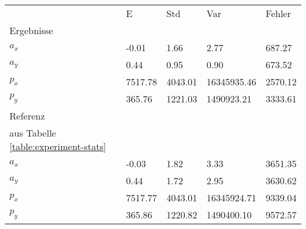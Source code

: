 \begin{tabular}{l|l|l|l|l}

     & E   & Std    & Var    & Fehler \\
\hhline{=|=|=|=|=}

Ergebnisse & & & & \\
$a_x$  &        -0.01 &         1.66 &         2.77 &       687.27 \\
$a_y$  &         0.44 &         0.95 &         0.90 &       673.52 \\
$p_x$  &      7517.78 &      4043.01 &  16345935.46 &      2570.12 \\
$p_y$  &       365.76 &      1221.03 &   1490923.21 &      3333.61 \\

\hline
Referenz & & & & \\
aus Tabelle  \ref{table:experiment-stats} & & & & \\
$a_x$  &        -0.03 &         1.82 &         3.33 &      3651.35 \\
$a_y$  &         0.44 &         1.72 &         2.95 &      3630.62 \\
$p_x$  &      7517.77 &      4043.01 &  16345924.71 &      9339.04 \\
$p_y$  &       365.86 &      1220.82 &   1490400.10 &      9572.57 \\
\end{tabular}
